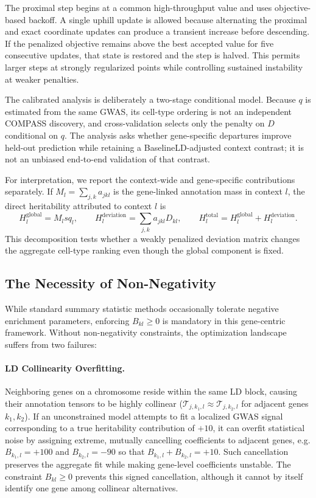 \documentclass[11pt]{article}
\begin{document}
The proximal step begins at a common high-throughput value and uses objective-based backoff. A single uphill update is allowed because alternating the proximal and exact coordinate updates can produce a transient increase before descending. If the penalized objective remains above the best accepted value for five consecutive updates, that state is restored and the step is halved. This permits larger steps at strongly regularized points while controlling sustained instability at weaker penalties.

The calibrated analysis is deliberately a two-stage conditional model. Because $q$ is estimated from the same GWAS, its cell-type ordering is not an independent COMPASS discovery, and cross-validation selects only the penalty on $D$ conditional on $q$. The analysis asks whether gene-specific departures improve held-out prediction while retaining a BaselineLD-adjusted context contrast; it is not an unbiased end-to-end validation of that contrast.

For interpretation, we report the context-wide and gene-specific contributions separately. If $M_l=\sum_{j,k}a_{jkl}$ is the gene-linked annotation mass in context $l$, the direct heritability attributed to context $l$ is
\begin{equation}
    H_l^{\mathrm{global}}=M_l s q_l,\qquad
    H_l^{\mathrm{deviation}}=\sum_{j,k}a_{jkl}D_{kl},\qquad
    H_l^{\mathrm{total}}=H_l^{\mathrm{global}}+H_l^{\mathrm{deviation}}.
\end{equation}
This decomposition tests whether a weakly penalized deviation matrix changes the aggregate cell-type ranking even though the global component is fixed.

\subsection{The Necessity of Non-Negativity}
While standard summary statistic methods occasionally tolerate negative enrichment parameters, enforcing $B_{kl} \ge 0$ is mandatory in this gene-centric framework. Without non-negativity constraints, the optimization landscape suffers from two failures:

\paragraph{LD Collinearity Overfitting.}
Neighboring genes on a chromosome reside within the same LD block, causing their annotation tensors to be highly collinear ($\mathcal{T}_{j, k_1, l} \approx \mathcal{T}_{j, k_2, l}$ for adjacent genes $k_1, k_2$). If an unconstrained model attempts to fit a localized GWAS signal corresponding to a true heritability contribution of $+10$, it can overfit statistical noise by assigning extreme, mutually cancelling coefficients to adjacent genes, e.g. $B_{k_1, l} = +100$ and $B_{k_2, l} = -90$ so that $B_{k_1, l} + B_{k_2, l} = +10$. Such cancellation preserves the aggregate fit while making gene-level coefficients unstable. The constraint $B_{kl} \ge 0$ prevents this signed cancellation, although it cannot by itself identify one gene among collinear alternatives.
\end{document}
